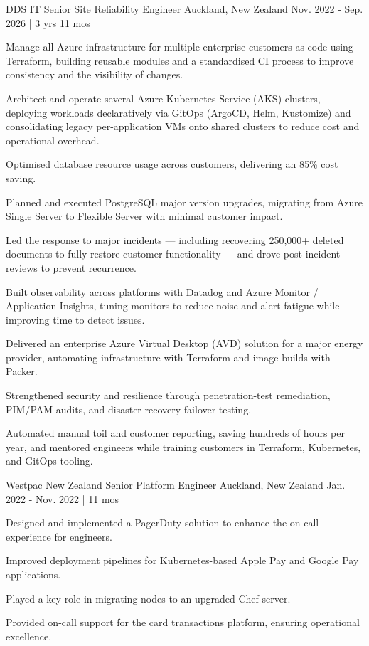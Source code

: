 \begin{cventries}
\cventry
{DDS IT} %
{Senior Site Reliability Engineer} %
{Auckland, New Zealand} %
{Nov. 2022 - Sep. 2026 | 3 yrs 11 mos} %
{ %
\begin{cvitems}
\item {Manage all Azure infrastructure for multiple enterprise customers as code using Terraform, building reusable modules and a standardised CI process to improve consistency and the visibility of changes.}
\item {Architect and operate several Azure Kubernetes Service (AKS) clusters, deploying workloads declaratively via GitOps (ArgoCD, Helm, Kustomize) and consolidating legacy per-application VMs onto shared clusters to reduce cost and operational overhead.}
\item {Optimised database resource usage across customers, delivering an 85\% cost saving.}
\item {Planned and executed PostgreSQL major version upgrades, migrating from Azure Single Server to Flexible Server with minimal customer impact.}
\item {Led the response to major incidents --- including recovering 250,000+ deleted documents to fully restore customer functionality --- and drove post-incident reviews to prevent recurrence.}
\item {Built observability across platforms with Datadog and Azure Monitor / Application Insights, tuning monitors to reduce noise and alert fatigue while improving time to detect issues.}
\item {Delivered an enterprise Azure Virtual Desktop (AVD) solution for a major energy provider, automating infrastructure with Terraform and image builds with Packer.}
\item {Strengthened security and resilience through penetration-test remediation, PIM/PAM audits, and disaster-recovery failover testing.}
\item {Automated manual toil and customer reporting, saving hundreds of hours per year, and mentored engineers while training customers in Terraform, Kubernetes, and GitOps tooling.}
\end{cvitems}
}


\cventry
{Westpac New Zealand} %
{Senior Platform Engineer} %
{Auckland, New Zealand} %
{Jan. 2022 - Nov. 2022 | 11 mos} %
{ %
\begin{cvitems}
\item {Designed and implemented a PagerDuty solution to enhance the on-call experience for engineers.}
\item {Improved deployment pipelines for Kubernetes-based Apple Pay and Google Pay applications.}
\item {Played a key role in migrating nodes to an upgraded Chef server.}
\item {Provided on-call support for the card transactions platform, ensuring operational excellence.}
\end{cvitems}
}


\end{cventries}
